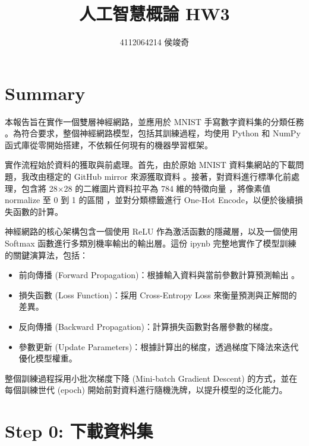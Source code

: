 \documentclass[11pt]{article}
\title{人工智慧概論 HW3}
\author{4112064214 侯竣奇}
\providecommand{\tightlist}{%
      \setlength{\itemsep}{0pt}\setlength{\parskip}{0pt}}
\begin{document}
    
    \maketitle
    
    

    
    \section{Summary}\label{summary}

本報告旨在實作一個雙層神經網路，並應用於 MNIST 手寫數字資料集的分類任務
。為符合要求，整個神經網路模型，包括其訓練過程，均使用 Python 和 NumPy
函式庫從零開始搭建，不依賴任何現有的機器學習框架。

實作流程始於資料的獲取與前處理。首先，由於原始 MNIST
資料集網站的下載問題，我改由穩定的 GitHub mirror 來源獲取資料
。接著，對資料進行標準化前處理，包含將 28×28 的二維圖片資料拉平為 784
維的特徵向量 ，將像素值 normalize 至 0 到 1 的區間 ，並對分類標籤進行
One-Hot Encode，以便於後續損失函數的計算。

神經網路的核心架構包含一個使用 ReLU 作為激活函數的隱藏層，以及一個使用
Softmax 函數進行多類別機率輸出的輸出層。這份 ipynb
完整地實作了模型訓練的關鍵演算法，包括：

\begin{itemize}
\tightlist
\item
  前向傳播 (Forward Propagation)：根據輸入資料與當前參數計算預測輸出 。
\item
  損失函數 (Loss Function)：採用 Cross-Entropy Loss
  來衡量預測與正解間的差異。
\item
  反向傳播 (Backward Propagation)：計算損失函數對各層參數的梯度。
\item
  參數更新 (Update
  Parameters)：根據計算出的梯度，透過梯度下降法來迭代優化模型權重。
\end{itemize}

整個訓練過程採用小批次梯度下降 (Mini-batch Gradient Descent)
的方式，並在每個訓練世代 (epoch)
開始前對資料進行隨機洗牌，以提升模型的泛化能力。

    \section{Step 0:
下載資料集}\label{step-0-ux4e0bux8f09ux8cc7ux6599ux96c6}
\end{document}
